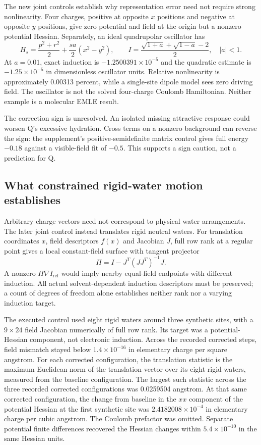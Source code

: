 \documentclass{article}
\begin{document}
The new joint controls establish why representation error need not require strong nonlinearity. Four charges, positive at opposite $x$ positions and negative at opposite $y$ positions, give zero potential and field at the origin but a nonzero potential Hessian. Separately, an ideal quadrupolar oscillator has
\begin{equation*}
H_s=\frac{p^2+r^2}{2}+\frac{sa}{2}(x^2-y^2),\qquad
I=\frac{\sqrt{1+a}+\sqrt{1-a}-2}{2},\quad |a|<1.
\end{equation*}
At $a=0.01$, exact induction is $-1.2500391\times10^{-5}$ and the quadratic estimate is $-1.25\times10^{-5}$ in dimensionless oscillator units. Relative nonlinearity is approximately 0.00313 percent, while a single-site dipole model sees zero driving field. The oscillator is not the solved four-charge Coulomb Hamiltonian. Neither example is a molecular EMLE result.

The correction sign is unresolved. An isolated missing attractive response could worsen Q's excessive hydration. Cross terms on a nonzero background can reverse the sign: the supplement's positive-semidefinite matrix control gives full energy $-0.18$ against a visible-field fit of $-0.5$. This supports a sign caution, not a prediction for Q.

\subsection{What constrained rigid-water motion establishes}

Arbitrary charge vectors need not correspond to physical water arrangements. The later joint control instead translates rigid neutral waters. For translation coordinates $x$, field descriptors $f(x)$ and Jacobian $J$, full row rank at a regular point gives a local constant-field surface with tangent projector
\begin{equation*}
\Pi=I-J^T(JJ^T)^{-1}J.
\end{equation*}
A nonzero $\Pi\nabla I_{\mathrm{ref}}$ would imply nearby equal-field endpoints with different induction. All actual solvent-dependent induction descriptors must be preserved; a count of degrees of freedom alone establishes neither rank nor a varying induction target.

The executed control used eight rigid waters around three synthetic sites, with a $9\times24$ field Jacobian numerically of full row rank. Its target was a potential-Hessian component, not electronic induction. Across the recorded corrected steps, field mismatch stayed below $1.4\times10^{-16}$ in elementary charge per square angstrom. For each corrected configuration, the translation statistic is the maximum Euclidean norm of the translation vector over its eight rigid waters, measured from the baseline configuration. The largest such statistic across the three recorded corrected configurations was 0.0259504 angstrom. At that same corrected configuration, the change from baseline in the $xx$ component of the potential Hessian at the first synthetic site was $2.4182008\times10^{-4}$ in elementary charge per cubic angstrom. The Coulomb prefactor was omitted. Separate potential finite differences recovered the Hessian changes within $5.4\times10^{-10}$ in the same Hessian units.
\end{document}
